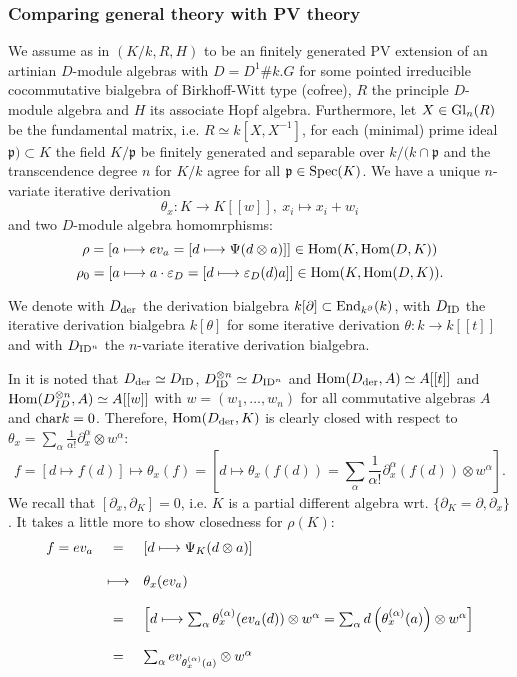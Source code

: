 \subsubsection{Comparing general theory with PV theory}
We assume as in \cite{Heid13} $(K/k, R, H)$ to be an finitely generated PV extension of an artinian $D$-module algebras with $D = D^1 \# k.G$ for some pointed irreducible cocommutative bialgebra of Birkhoff-Witt type (cofree), $R$ the principle $D$-module algebra and $H$ its associate Hopf algebra. Furthermore, let $X \in \trm{Gl}_n(R)$ be the fundamental matrix, i.e. $R \simeq k[X,X^{-1}]$, for each (minimal) prime ideal $\mathfrak{p}) \subset K$ the field $K/\mathfrak{p}$ be finitely generated and separable over $k/(k \cap \mathfrak{p}$ and the transcendence degree $n$ for $K/k$ agree for all $\mathfrak{p} \in \trm{Spec}(K)$. We have a unique $n$-variate iterative derivation
$$\theta_x : K \longrightarrow K[[w]],\ x_i \longmapsto x_i + w_i$$
and two $D$-module algebra homomrphisms:
$$\rho = [a \longmapsto ev_a = [d \longmapsto \Psi(d \otimes a)]] \in \trm{Hom}(K, \trm{Hom}(D, K))$$
$$\rho_0 = [a \longmapsto a \cdot \eps_D = [d \longmapsto \eps_D(d) a]] \in \trm{Hom}(K, \trm{Hom}(D,K)).$$
\begin{defi}
We denote with $D_{\trm{der}}$ the derivation bialgebra $k[\partial] \subset \trm{End}_{k^\partial}(k)$, with
$D_{\trm{ID}}$ the iterative derivation bialgebra $k[\theta]$ for some iterative derivation $\theta : k \longrightarrow k[[t]]$ and with $D_{\trm{ID}^n}$ the $n$-variate iterative derivation bialgebra.
\end{defi}
In \cite{Heid13} it is noted that $D_{\trm{der}} \simeq D_{\trm{ID}}$, $D_{\trm{ID}}^{\otimes n} \simeq D_{\trm{ID}^n}$ and $\trm{Hom}(D_{\trm{der}},A) \simeq A[[t]]$ and $\trm{Hom}(D_{ID}^{\otimes n}, A) \simeq A[[w]]$ with $w = (w_1,\ldots,w_n)$ for all commutative algebras $A$ and $\trm{char}k = 0$. Therefore, $\trm{Hom}(D_{\trm{der}},K)$ is clearly closed with respect to $\theta_x = \sum_{\alpha} \frac{1}{\alpha!}\partial_x^\alpha \otimes w^\alpha$:
$$f = [d \longmapsto f(d)] \longmapsto \theta_x(f) = \left[d \longmapsto \theta_x(f(d)) = \sum_\alpha \frac{1}{\alpha!} \partial_x^\alpha(f(d)) \otimes w^\alpha\right].$$
We recall that $[\partial_x,\partial_K] = 0$, i.e. $K$ is a partial different algebra wrt. $\{\partial_K = \partial, \partial_x\}$. It takes a little more to show closedness for $\rho(K)$:
$$\bao{rcl}
f = ev_a &=& [d \longmapsto \Psi_K(d \otimes a)]\\
&&\\
&\longmapsto& \theta_x(ev_a)\\
&&\\
&=& \left[d \longmapsto \sum_\alpha \theta_x^{(\alpha)} (ev_a(d)) \otimes w^\alpha = \sum_\alpha d\left(\theta^{(\alpha)}_x(a)\right) \otimes w^\alpha\right]\\
&&\\
&=& \sum_\alpha ev_{\theta^{(\alpha)}_x(a)} \otimes w^\alpha\\
\ea$$
